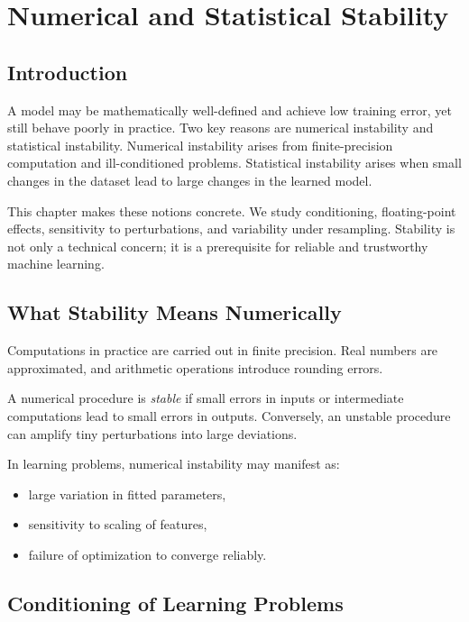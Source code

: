 \chapter{Numerical and Statistical Stability}

\section{Introduction}

A model may be mathematically well-defined and achieve low training error, yet still behave poorly in practice. Two key reasons are numerical instability and statistical instability. Numerical instability arises from finite-precision computation and ill-conditioned problems. Statistical instability arises when small changes in the dataset lead to large changes in the learned model.

This chapter makes these notions concrete. We study conditioning, floating-point effects, sensitivity to perturbations, and variability under resampling. Stability is not only a technical concern; it is a prerequisite for reliable and trustworthy machine learning.

\section{What Stability Means Numerically}

Computations in practice are carried out in finite precision. Real numbers are approximated, and arithmetic operations introduce rounding errors.

A numerical procedure is \emph{stable} if small errors in inputs or intermediate computations lead to small errors in outputs. Conversely, an unstable procedure can amplify tiny perturbations into large deviations.

In learning problems, numerical instability may manifest as:
\begin{itemize}
    \item large variation in fitted parameters,
    \item sensitivity to scaling of features,
    \item failure of optimization to converge reliably.
\end{itemize}

\section{Conditioning of Learning Problems}

